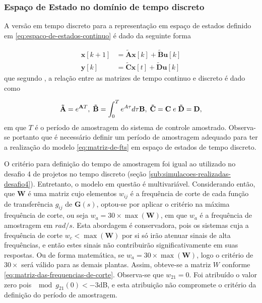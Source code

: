 \subsubsection{Espaço de Estado no domínio de tempo discreto}
\label{subsub:espaco-de-estados-no-dominio-de-tempo-discreto}

A versão em tempo discreto para a representação em espaço de estados definido em
\ref{eq:espaco-de-estados-continuo} é dado da seguinte forma

\begin{subequations}
    \label{eq:espaco-de-estados-discreto}
    \begin{align}
        \mathbf{x}[k+1] &= \mathbf{\tilde{A}}\mathbf{x}[k] + \mathbf{\tilde{B}}\mathbf{u}[k]
        \label{eq:estimativa-do-vetor-de-estados}\\
        \mathbf{y}[k] &= \mathbf{\tilde{C}}\mathbf{x}[t] + \mathbf{\tilde{D}}\mathbf{u}[k]
        \label{eq:saida-do-sistema-em-espaco-de-estados-discreto}
    \end{align}
\end{subequations} que segundo , a relação entre as
matrizes de tempo continuo e discreto é dado como

\begin{equation*}
    \mathbf{\tilde{A}} = e^{\mathbf{A}T},
    \thickspace
    \mathbf{\tilde{B}} = \int_{0}^{T}e^{A\tau}d\tau \mathbf{B},
    \thickspace
    \mathbf{\tilde{C}} = \mathbf{C}
    \thickspace e \thickspace
    \mathbf{\tilde{D}} = \mathbf{D},
\end{equation*} em que $T$ é o período de amostragem do sistema de controle
amostrado. Observa-se portanto que é necessário definir um período de amostragem
adequado para ter a realização do modelo \ref{eq:matriz-de-fts} em espaço de
estados de tempo discreto.

O critério para definição do tempo de amostragem foi igual ao utilizado no
desafio 4 de projetos no tempo discreto (seção
\ref{sub:simulacoes-realizadas-desafio4}). Entretanto, o modelo em questão é
multivariável. Considerando então, que $\mathbf{W}$ é uma matriz cujo elementos
$w_{ij}$ é a frequência de corte de cada função de transferência $g_{ij}$ de
$\mathbf{G}(s)$, optou-se por aplicar o critério na máxima frequência de corte,
ou seja $w_a = 30\times\max(\mathbf{W})$, em que $w_a$ é a frequência de
amostragem em $rad/s$. Esta abordagem é conservadora, pois os sistemas cuja a
frequência de corte $w_c < \max(\mathbf{W})$ por si só irão atenuar sinais de
alta frequências, e então estes sinais não contribuirão significativamente em
suas respostas. Ou de forma matemática, se $w_a = 30\times\max(\mathbf{W})$,
logo o critério de $30\times$ será válido para as demais plantas. Assim,
obteve-se a matriz $W$ conforme \ref{eq:matriz-das-frequencias-de-corte}.
Observa-se que $w_{21} = 0$. Foi atribuído o valor zero pois $\mod{g_{21}(0)} <
-3$dB, e esta atribuição não compromete o critério da definição do período de
amostragem.

